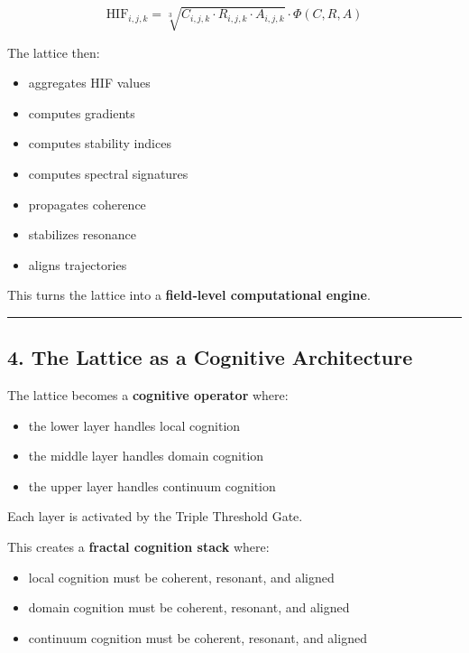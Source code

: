 \[
\text{HIF}_{i,j,k} = \sqrt[3]{C_{i,j,k} \cdot R_{i,j,k} \cdot A_{i,j,k}} \cdot \Phi(C,R,A)
\]

The lattice then:

\begin{itemize}
\tightlist
\item
  aggregates HIF values\\
\item
  computes gradients\\
\item
  computes stability indices\\
\item
  computes spectral signatures\\
\item
  propagates coherence\\
\item
  stabilizes resonance\\
\item
  aligns trajectories
\end{itemize}

This turns the lattice into a \textbf{field‑level computational engine}.

\begin{center}\rule{0.5\linewidth}{0.5pt}\end{center}

\subsection{4. The Lattice as a Cognitive Architecture}\label{the-lattice-as-a-cognitive-architecture}

The lattice becomes a \textbf{cognitive operator} where:

\begin{itemize}
\tightlist
\item
  the lower layer handles local cognition\\
\item
  the middle layer handles domain cognition\\
\item
  the upper layer handles continuum cognition
\end{itemize}

Each layer is activated by the Triple Threshold Gate.

This creates a \textbf{fractal cognition stack} where:

\begin{itemize}
\tightlist
\item
  local cognition must be coherent, resonant, and aligned\\
\item
  domain cognition must be coherent, resonant, and aligned\\
\item
  continuum cognition must be coherent, resonant, and aligned
\end{itemize}

